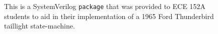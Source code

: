 
\begin{figure}[t]
    \centering
    \footnotesize
    \inputminted[frame=single]{SystemVerilog}{media/code/ece152a_pkg.sv}
    \caption[
        \texttt{package} included in introductory SystemVerilog course
    ]{
        This is a SystemVerilog \texttt{package} that was provided to ECE 152A students to aid in their implementation of a 1965 Ford Thunderbird taillight state-machine.
    }
    \label{fig:ece152a_pkg}
\end{figure}
